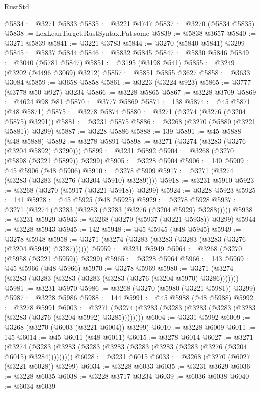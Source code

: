 \begin{lexlean}{RustStd}
\begin{coremodule}
@5834 := @3271 @5833
@5835 := @3221 @4747
@5837 := @3270 (@5834 @5835)
@5838 := LexLeanTarget.RustSyntax.Pat.some
@5839 := @5838 @3657
@5840 := @3271 @5839
@5841 := @3221 @3783
@5844 := @3270 (@5840 @5841) @3299
@5845 := @5837 @5844
@5846 := @5832 @5845
@5847 := @5830 @5846
@5849 := @3040 (@5781 @5847)
@5851 := @3195 (@3198 @541)
@5855 := @3249 (@3202 (@4496 @3069) @3212)
@5857 := @5851 @5855 @3627
@5858 := @3633 @3084
@5859 := @3658 @5858
@5861 := @3223 (@3224 @923)
@5865 := @3777 (@3778 @50 @927) @3234
@5866 := @3228 @5865
@5867 := @3228 @3709
@5869 := @4624 @98 @81
@5870 := @3777 @5869
@5871 := 138
@5874 := @45 @5871 (@48 @5871)
@5875 := @3278 @5874
@5880 := @3271 (@3274 (@3276 (@3204 @5875) @3291))
@5881 := @3231 @5875
@5886 := @3268 (@3270 (@5880 (@3221 @5881)) @3299)
@5887 := @3228 @5886
@5888 := 139
@5891 := @45 @5888 (@48 @5888)
@5892 := @3278 @5891
@5898 := @3271 (@3274 (@3283 (@3276 (@3204 @5892) @3290)))
@5899 := @3231 @5892
@5904 := @3268 (@3270 (@5898 (@3221 @5899)) @3299)
@5905 := @3228 @5904
@5906 := 140
@5909 := @45 @5906 (@48 @5906)
@5910 := @3278 @5909
@5917 := @3271 (@3274 (@3283 (@3283 (@3276 (@3204 @5910) @3289))))
@5918 := @3231 @5910
@5923 := @3268 (@3270 (@5917 (@3221 @5918)) @3299)
@5924 := @3228 @5923
@5925 := 141
@5928 := @45 @5925 (@48 @5925)
@5929 := @3278 @5928
@5937 := @3271 (@3274 (@3283 (@3283 (@3283 (@3276 (@3204 @5929) @3288)))))
@5938 := @3231 @5929
@5943 := @3268 (@3270 (@5937 (@3221 @5938)) @3299)
@5944 := @3228 @5943
@5945 := 142
@5948 := @45 @5945 (@48 @5945)
@5949 := @3278 @5948
@5958 := @3271 (@3274 (@3283 (@3283 (@3283 (@3283 (@3276 (@3204 @5949) @3287))))))
@5959 := @3231 @5949
@5964 := @3268 (@3270 (@5958 (@3221 @5959)) @3299)
@5965 := @3228 @5964
@5966 := 143
@5969 := @45 @5966 (@48 @5966)
@5970 := @3278 @5969
@5980 := @3271 (@3274 (@3283 (@3283 (@3283 (@3283 (@3283 (@3276 (@3204 @5970) @3286)))))))
@5981 := @3231 @5970
@5986 := @3268 (@3270 (@5980 (@3221 @5981)) @3299)
@5987 := @3228 @5986
@5988 := 144
@5991 := @45 @5988 (@48 @5988)
@5992 := @3278 @5991
@6003 := @3271 (@3274 (@3283 (@3283 (@3283 (@3283 (@3283 (@3283 (@3276 (@3204 @5992) @3285))))))))
@6004 := @3231 @5992
@6009 := @3268 (@3270 (@6003 (@3221 @6004)) @3299)
@6010 := @3228 @6009
@6011 := 145
@6014 := @45 @6011 (@48 @6011)
@6015 := @3278 @6014
@6027 := @3271
    (@3274 (@3283 (@3283 (@3283 (@3283 (@3283 (@3283 (@3283 (@3276 (@3204 @6015) @3284)))))))))
@6028 := @3231 @6015
@6033 := @3268 (@3270 (@6027 (@3221 @6028)) @3299)
@6034 := @3228 @6033
@6035 := @3231 @3629
@6036 := @3228 @6035
@6038 := @3228 @3717 @3234
@6039 := @6036 @6038
@6040 := @6034 @6039

\end{coremodule}
\end{lexlean}
